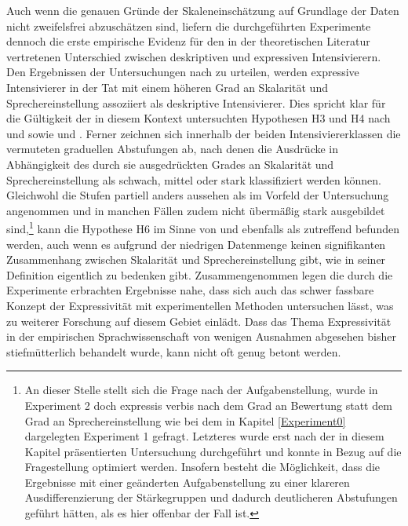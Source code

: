 Auch wenn die genauen Gründe der Skaleneinschätzung auf Grundlage der Daten nicht zweifelsfrei abzuschätzen sind, liefern die durchgeführten Experimente dennoch die erste empirische Evidenz für den in der theoretischen Literatur vertretenen Unterschied zwischen deskriptiven und expressiven Intensivierern. Den Ergebnissen der Untersuchungen nach zu urteilen, werden expressive Intensivierer in der Tat mit einem höheren Grad an Skalarität und Sprechereinstellung assoziiert als deskriptive Intensivierer. Dies spricht klar für die Gültigkeit der in diesem Kontext untersuchten Hypothesen H3 und H4 nach \citet[22]{Paradis.1997} und \citet[133]{Gutzmann.2019a} sowie {\citet[315]{Lang.1983}} und \citet[57]{Ortner.2014}. Ferner zeichnen sich innerhalb der beiden Intensiviererklassen die vermuteten graduellen Abstufungen ab, nach denen die Ausdrücke in Abhängigkeit des durch sie ausgedrückten Grades an Skalarität und Sprechereinstellung als schwach, mittel oder stark klassifiziert werden können. Gleichwohl die Stufen partiell anders aussehen als im Vorfeld der Untersuchung angenommen und in manchen Fällen zudem nicht übermäßig stark ausgebildet sind,\footnote{An dieser Stelle stellt sich die Frage nach der Aufgabenstellung, wurde in Experiment 2 doch expressis verbis nach dem Grad an Bewertung statt dem Grad an Sprechereinstellung wie bei dem in Kapitel \ref{Experiment0} dargelegten Experiment 1 gefragt. Letzteres wurde erst nach der in diesem Kapitel präsentierten Untersuchung durchgeführt und konnte in Bezug auf die Fragestellung optimiert werden. Insofern besteht die Möglichkeit, dass die Ergebnisse mit einer geänderten Aufgabenstellung zu einer klareren Ausdifferenzierung der Stärkegruppen und dadurch deutlicheren Abstufungen geführt hätten, als es hier offenbar der Fall ist.} kann die {Hypothese H6} im Sinne von \citet[87]{Biedermann.1969} und {\citet[408]{Breindl.2007}} ebenfalls als zutreffend befunden werden, auch wenn es aufgrund der niedrigen Datenmenge keinen signifikanten Zusammenhang zwischen Skalarität und Sprechereinstellung gibt, wie {\citet[133]{Gutzmann.2019a}} in seiner Definition eigentlich zu bedenken gibt. Zusammengenommen legen die durch die Experimente erbrachten Ergebnisse nahe, dass sich auch das schwer fassbare Konzept der Expressivität mit experimentellen Methoden untersuchen lässt, was zu weiterer Forschung auf diesem Gebiet einlädt. Dass das Thema Expressivität in der empirischen Sprachwissenschaft von wenigen Ausnahmen abgesehen bisher stiefmütterlich behandelt wurde, kann nicht oft genug betont werden.




